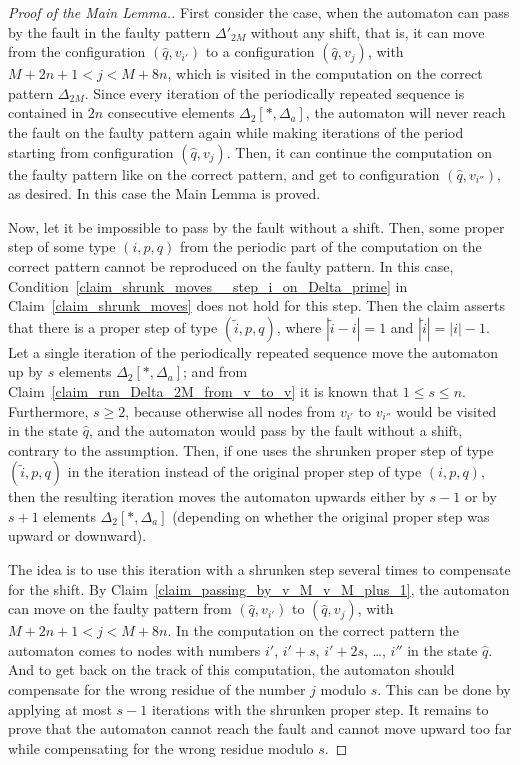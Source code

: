 \documentclass[12pt,a4paper]{article}
\theoremstyle{definition}
\begin{document}
\begin{proof}[Proof of the Main Lemma.]
First consider the case,
when the automaton can pass by the fault in the faulty pattern $\Delta'_{2M}$
without any shift,
that is, it can move from the configuration $(\widehat{q},v_{i'})$
to a configuration $(\widehat{q},v_j)$, with $M+2n+1 < j < M+8n$,
which is visited in the computation on the correct pattern $\Delta_{2M}$.
Since every iteration of the periodically
repeated sequence is contained in $2n$ consecutive elements $\Delta_2[*,\Delta_a]$,
the automaton will never reach the fault on the faulty pattern again
while making iterations of the period starting from configuration $(\widehat{q},v_j)$.
Then, it can continue the computation on the faulty pattern like on the correct pattern,
and get to configuration $(\widehat{q},v_{i''})$, as desired.
In this case the Main Lemma is proved.

Now, let it be impossible to pass by the fault without a shift.
Then, some proper step of some type $(i,p,q)$
from the periodic part of the computation on the correct pattern 
cannot be reproduced on the faulty pattern.
In this case,
Condition~\ref{claim_shrunk_moves__step_i_on_Delta_prime} in Claim~\ref{claim_shrunk_moves}
does not hold for this step.
Then the claim asserts that
there is a proper step of type $(\widetilde{i},p,q)$,
where $|\widetilde{i}-i|=1$ and $|\widetilde{i}|=|i|-1$.
Let a single iteration of the periodically repeated sequence
move the automaton up by $s$ elements $\Delta_2[*,\Delta_a]$;
and from Claim~\ref{claim_run_Delta_2M_from_v_to_v} it is known that $1 \leqslant s \leqslant n$.
Furthermore, $s \geqslant 2$, because otherwise all nodes from $v_{i'}$ to $v_{i''}$
would be visited in the state $\widehat{q}$,
and the automaton would pass by the fault without a shift,
contrary to the assumption.
Then, if one uses the shrunken proper step of type $(\widetilde{i},p,q)$ in the iteration
instead of the original proper step of type $(i,p,q)$,
then the resulting iteration moves the automaton upwards
either by $s-1$ or by $s+1$ elements $\Delta_2[*,\Delta_a]$
(depending on whether the original proper step was upward or downward).

The idea is to use this iteration with a shrunken step several times to compensate for the shift.
By Claim~\ref{claim_passing_by_v_M_v_M_plus_1},
the automaton can move on the faulty pattern
from $(\widehat{q},v_{i'})$ to $(\widehat{q},v_j)$, with $M+2n+1 < j < M+8n$.
In the computation on the correct pattern the automaton comes to nodes with numbers 
$i'$, $i'+s$, $i'+2s$, \ldots, $i''$ in the state $\widehat{q}$.
And to get back on the track of this computation,
the automaton should compensate for the wrong residue of the number 
$j$ modulo $s$.
This can be done by applying at most $s-1$ 
iterations with the shrunken proper step.
It remains to prove that the automaton cannot reach the fault
and cannot move upward too far
while compensating for the wrong residue modulo $s$.


\end{proof}
\end{document}
